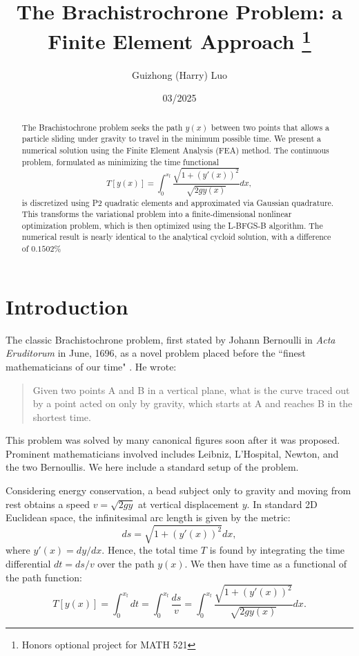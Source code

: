 \documentclass[11pt]{article}
\title{The Brachistrochrone Problem: a Finite Element Approach \thanks{Honors optional project for MATH 521}}
\author{Guizhong (Harry) Luo}
\date{03/2025}
\begin{document}
\maketitle 
\begin{abstract}
    The Brachistochrone problem seeks the path \(y(x)\) between two points that allows a particle sliding under gravity to travel in the minimum possible time. We present a numerical solution using the Finite Element Analysis (FEA) method. The continuous problem, formulated as minimizing the time functional 
    \begin{equation}
    T[y(x)] = \int_0^{x_\mathrm{f}}\frac{\sqrt{1 + (y'(x))^2}}{\sqrt{2gy(x)}} dx,
    \label{eq:T}
    \end{equation}
        is discretized using P2 quadratic elements and approximated via Gaussian quadrature. This transforms the variational problem into a finite-dimensional nonlinear optimization problem, which is then optimized using the L-BFGS-B algorithm. 
    The numerical result is nearly identical to the analytical cycloid solution, with a difference of \(0.1502\%\)
\end{abstract}


\section{Introduction}
The classic Brachistochrone problem, first stated by Johann Bernoulli in \textit{Acta Eruditorum} in June, 1696, as a novel problem placed before the ``finest mathematicians of our time" \cite{Bernoulli1696BrachWikip}. He wrote: 
\begin{quotation}
    Given two points A and B in a vertical plane, what is the curve traced out by a point acted on only by gravity, which starts at A and reaches B in the shortest time.
\end{quotation}
This problem was solved by many canonical figures soon after it was proposed. Prominent mathematicians involved includes Leibniz, L'Hospital, Newton, and the two Bernoullis\cite{Padyala2019Brachistochrone}. We here include a standard setup of the problem.

Considering energy conservation, a bead subject only to gravity and moving from rest obtains a speed \(v = \sqrt{2 g y}\) at vertical displacement \(y\). In standard 2D Euclidean space, the infinitesimal arc length is given by the metric:
\[
 ds = \sqrt{1 + (y'(x))^2} dx,
\]
where \(y'(x) = dy / dx.\) Hence, the total time \(T\) is found by integrating the time differential \(dt = ds / v\) over the path \(y(x)\). We then have time as a functional of the path function:
\[
T[y(x)] = \int_0^{x_\mathrm{f}}dt =  \int_0^{x_\mathrm{f}} \frac{ds}{v} =  \int_0^{x_\mathrm{f}} \frac{\sqrt{1 + (y'(x))^2}}{\sqrt{2gy(x)}} dx.
\]
\end{document}
